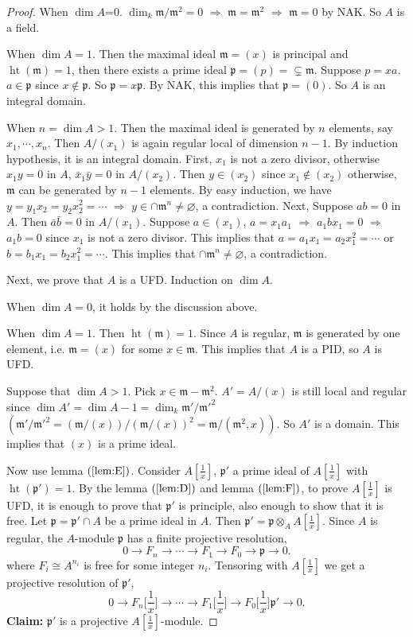 \documentclass[cs4size]{article}
\newcommand{\frm}{\mathfrak{m}}
\newcommand{\frp}{\mathfrak{p}}
\newcommand{\ra}{\rightarrow}
\newcommand{\Ra}{\Rightarrow}
\DeclareMathOperator{\height}{ht}
\begin{document}
\begin{proof}
When $\dim A$=0. $\dim_k\frm/\frm^2=0$ $\Ra$ $\frm=\frm^2$ $\Ra$ $\frm=0$ by NAK. So $A$ is a field.

When $\dim A=1$. Then the maximal ideal $\frm=(x)$ is principal and $\height(\frm)=1$, then there exists a prime ideal $\frp=(p)=\varsubsetneq\frm$. Suppose $p=xa$. $a\in \frp$ since $x\notin\frp$. So $\frp=x\frp$. By NAK, this implies that $\frp=(0)$. So $A$ is an integral domain.

When $n=\dim A>1$. Then the maximal ideal is generated by $n$ elements, say $x_1,\cdots,x_n$. Then $A/(x_1)$ is again regular local of dimension $n-1$. By induction hypothesis, it is an integral domain. First, $x_1$ is not a zero divisor, otherwise $x_1y=0$ in $A$, $\bar{x}_1\bar{y}=0$ in $A/(x_2)$. Then $y\in(x_2)$ since $x_1\notin (x_2)$ otherwise, $\frm$ can be generated by $n-1$ elements. By easy induction, we have $y=y_1x_2=y_2x_2^2=\cdots$ $\Ra$ $y\in\cap \frm^n\neq\varnothing$, a contradiction. Next, Suppose $ab=0$ in $A$. Then $\bar{a}\bar{b}=0$ in $A/(x_1)$. Suppose $a\in (x_1)$, $a=x_1a_1$ $\Ra$ $a_1bx_1=0$ $\Ra$ $a_1b=0$ since $x_1$ is not a zero divisor. This implies that $a=a_1x_1=a_2x_1^2=\cdots$ or $b=b_1x_1=b_2x_1^2=\cdots$. This implies that $\cap \frm^n\neq \varnothing$, a contradiction.

Next, we prove that $A$ is a UFD. Induction on $\dim A$.

When $\dim A=0$, it holds by the discussion above.

When $\dim A=1$. Then $\height(\frm)=1$. Since $A$ is regular, $\frm$ is generated by one element, i.e. $\frm=(x)$ for some $x\in \frm$. This implies that $A$ is a PID, so $A$ is UFD.

Suppose that $\dim A>1$. Pick $x\in\frm-\frm^2$. $A'=A/(x)$ is still local and regular since $\dim A'=\dim A-1=\dim_k\frm'/\frm'^2$ $(\frm'/\frm'^2=(\frm/(x))/(\frm/(x))^2=\frm/(\frm^2,x))$. So $A'$ is a domain. This implies that $(x)$ is a prime ideal.

Now use lemma $(\ref{lem:E})$. Consider $A[\frac{1}{x}]$, $\frp'$ a prime ideal of $A[\frac{1}{x}]$ with $\height(\frp')=1$. By the lemma $(\ref{lem:D})$ and lemma $(\ref{lem:F})$, to prove $A[\frac{1}{x}]$ is UFD, it is enough to prove that $\frp'$ is principle, also enough to show that it is free. Let $\frp=\frp'\cap A$ be a prime ideal in $A$. Then $\frp'=\frp\otimes_AA[\frac{1}{x}]$. Since $A$ is regular, the $A$-module $\frp$ has a finite projective resolution,
\[0\ra F_n\ra \cdots\ra F_1\ra F_0\ra \frp\ra 0.\]
where $F_i\cong A^{n_i}$ is free for some integer $n_i$. Tensoring with $A[\frac{1}{x}]$ we get a projective resolution of $\frp'$,
\[0\ra F_n\big[\frac{1}{x}\big]\ra \cdots \ra F_1\big[\frac{1}{x}\big]\ra F_0\big[\frac{1}{x}\big]\frp'\ra 0.\]
\textbf{Claim:} $\frp'$ is a projective $A[\frac{1}{x}]$-module.


\end{proof}
\end{document}
